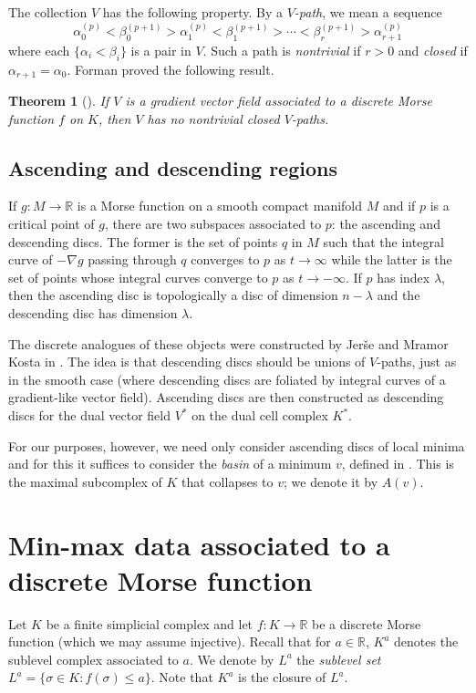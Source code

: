 \documentclass[11pt]{amsart}
\newtheorem{theorem}{Theorem}[section]
\theoremstyle{definition}
\newcommand{\zr}{{\mathbb R}}
\begin{document}
The collection $V$ has the following property. By a \emph{$V$-path}, we mean a sequence $$\alpha^{(p)}_0 < \beta_0^{(p+1)}>\alpha_1^{(p)}<\beta_1^{(p+1)}>\cdots <\beta_r^{(p+1)}>\alpha_{r+1}^{(p)}$$ where each $\{\alpha_i<\beta_i\}$ is a pair in $V$. Such a path is {\em nontrivial} if $r>0$ and {\em closed} if $\alpha_{r+1}=\alpha_0$. Forman proved the following result.

\begin{theorem}[\cite{forman}] If $V$ is a gradient vector field associated to a discrete Morse function $f$ on $K$, then $V$ has no nontrivial closed $V$-paths.
\end{theorem}

\subsection*{Ascending and descending regions} If $g:M\to\zr$ is a Morse function on a smooth compact manifold $M$ and if $p$ is a critical point of $g$, there are two subspaces associated to $p$: the ascending and descending discs. The former is the set of points $q$ in $M$ such that the integral curve of $-\nabla g$ passing through $q$ converges to $p$ as $t\to \infty$ while the latter is the set of points whose integral curves converge to $p$ as $t\to-\infty$. If $p$ has index $\lambda$, then the ascending disc is topologically a disc of dimension $n-\lambda$ and the descending disc has dimension $\lambda$. 

The discrete analogues of these objects were constructed by Jer\v{s}e and Mramor Kosta in \cite{jerse-kosta}. The idea is that descending discs should be unions of $V$-paths, just as in the smooth case (where descending discs are foliated by integral curves of a gradient-like vector field). Ascending discs are then constructed as descending discs for the dual vector field $V^\ast$ on the dual cell complex $K^\ast$. 

For our purposes, however, we need only consider ascending discs of local minima and for this it suffices to consider the {\em basin} of a minimum $v$, defined in \cite{robins}. This is the maximal subcomplex of $K$ that collapses to $v$; we denote it by $A(v)$.

\section{Min-max data associated to a discrete Morse function}\label{minmaxdata}

Let $K$ be a finite simplicial complex and let $f:K\to\zr$ be a discrete Morse function (which we may assume injective). Recall that for $a\in\zr$, $K^a$ denotes the sublevel complex associated to $a$. We denote by $L^a$ the {\em sublevel set} $L^a=\{\sigma\in K: f(\sigma)\le a\}$. Note that $K^a$ is the closure of $L^a$.
\end{document}
